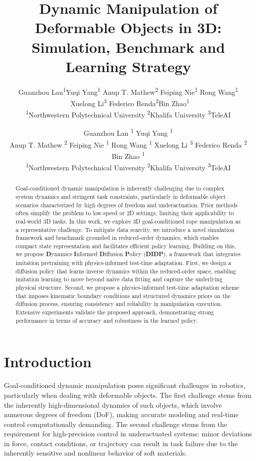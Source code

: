 \documentclass{article}
\title{Dynamic Manipulation of Deformable Objects in 3D: Simulation, Benchmark and Learning Strategy}
\author{
  \begin{tabular}{c}
    Guanzhou Lan\textsuperscript{1}\footnotemark[1] \quad Yuqi Yang\textsuperscript{1}\footnotemark[1] \quad 
    Anup T. Mathew\textsuperscript{2} \quad Feiping Nie\textsuperscript{1} \quad Rong Wang\textsuperscript{1} \\ \ Xuelong Li\textsuperscript{3} \quad 
    Federico Renda\textsuperscript{2}\footnotemark[2] \quad Bin Zhao\textsuperscript{1}\footnotemark[2] \\
    \textsuperscript{1}Northwestern Polytechnical University \quad
   \textsuperscript{2}Khalifa University \quad
   \textsuperscript{3}TeleAI
  \end{tabular}
}
\author{%
  Guanzhou Lan \textsuperscript{\rm 1}\footnotemark[1] 
  \And
  Yuqi Yang \textsuperscript{\rm 1}\footnotemark[1] \\
  \AND
   Anup T. Mathew  \textsuperscript{\rm 2}
  \And
  Feiping Nie  \textsuperscript{\rm 1}
  \And
  Rong Wang  \textsuperscript{\rm 1}
\And
  Xuelong Li  \textsuperscript{\rm 3}  
 \AND 
  Federico Renda  \textsuperscript{\rm 2}\footnotemark[2] 
    \And
  Bin Zhao  \textsuperscript{\rm 1}\footnotemark[2]\\
   \textsuperscript{1}Northwestern Polytechnical University
  \enspace
    \textsuperscript{2}Khalifa University  
     \enspace
     \textsuperscript{3}TeleAI  \\
}
\begin{document}
\maketitle
{
\renewcommand{\thefootnote}{\fnsymbol{footnote}}
}

{
\renewcommand{\thefootnote}{\fnsymbol{footnote}}
}


\begin{abstract}
Goal-conditioned dynamic manipulation is inherently challenging due to complex system dynamics and stringent task constraints, particularly in deformable object scenarios characterized by high degrees of freedom and underactuation. Prior methods often simplify the problem to low-speed or 2D settings, limiting their applicability to real-world 3D tasks. In this work, we explore 3D goal-conditioned rope manipulation as a representative challenge. To mitigate data scarcity, we introduce a novel simulation framework and benchmark grounded in reduced-order dynamics, which enables compact state representation and facilitates efficient policy learning. Building on this, we propose \textbf{D}ynamics \textbf{I}nformed \textbf{D}iffusion \textbf{P}olicy (\textbf{DIDP}), a framework that integrates imitation pretraining with physics-informed test-time adaptation. First, we design a diffusion policy that learns inverse dynamics within the reduced-order space, enabling imitation learning to move beyond naïve data fitting and capture the underlying physical structure. Second, we propose a physics-informed test-time adaptation scheme that imposes kinematic boundary conditions and structured dynamics priors on the diffusion process, ensuring consistency and reliability in manipulation execution. Extensive experiments validate the proposed approach, demonstrating strong performance in terms of accuracy and robustness in the learned policy.
\end{abstract}


\section{Introduction}





Goal-conditioned dynamic manipulation poses significant challenges in robotics, particularly when dealing with deformable objects. The first challenge stems from the inherently high-dimensional dynamics of such objects, which involve numerous degrees of freedom (DoF), making accurate modeling and real-time control computationally demanding. The second challenge stems from the requirement for high-precision control in underactuated systems: minor deviations in force, contact conditions, or trajectory can result in task failure due to the inherently sensitive and nonlinear behavior of soft materials.
\end{document}
